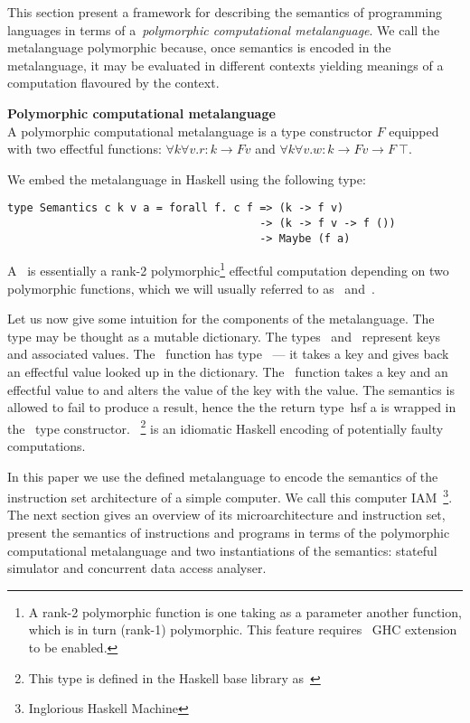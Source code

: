 This section present a framework for describing the semantics of programming languages
in terms of a~\emph{polymorphic computational metalanguage}. We call the metalanguage
polymorphic because, once semantics is encoded in the metalanguage,
it may be evaluated in different contexts yielding meanings of a computation
flavoured by the context.

\begin{definition}
\label{def:metalanguage}
\textbf{Polymorphic computational metalanguage}\\
A polymorphic computational metalanguage is a type constructor $F$ equipped with
two effectful functions: $\forall k \forall v.r: k \rightarrow F v$ and
$\forall k \forall v.w: k \rightarrow F v \rightarrow F~\top$.
\end{definition}

We embed the metalanguage in Haskell using the following type:

\begin{verbatim}
type Semantics c k v a = forall f. c f => (k -> f v)
                                       -> (k -> f v -> f ())
                                       -> Maybe (f a)
\end{verbatim}

A~ is essentially a rank-2 polymorphic\footnote{A rank-2 polymorphic
function is one taking as a parameter another function, which is in turn (rank-1)
polymorphic. This feature requires~ GHC extension to be enabled.}
effectful computation depending on two polymorphic functions,
which we will usually referred to as~ and~.

Let us now give some intuition for the components of the metalanguage.
The~
type may be thought as a mutable dictionary. The types~ and~ represent keys
and associated values. The~ function has type~ --- it takes
a key and gives back an effectful value looked up in the dictionary. The~
function takes a key and an effectful value to and alters the value of the key
with the value. The semantics is allowed to fail to produce a result, hence the
the return type~hs{f a} is wrapped in the~ type constructor.~
\footnote{This type is defined in the Haskell base library as~}
is an idiomatic Haskell encoding of potentially faulty computations.

In this paper we use the defined metalanguage to encode the semantics of the
instruction set architecture of a simple computer. We call this computer
IAM~\footnote{Inglorious Haskell Machine}. The next section gives an overview of
its microarchitecture and instruction set, present the semantics of instructions
and programs in terms of the polymorphic computational metalanguage and two
instantiations of the semantics: stateful simulator and concurrent data access
analyser.



